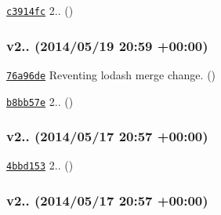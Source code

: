 \begin{DoxyItemize}
\item \href{https://github.com/mikeal/request/commit/c3914fcd4a74faf6dbf0fb6a4a188e871e0c51b8}{\tt c3914fc} 2.. ()
\end{DoxyItemize}

\subsubsection*{v2.. (2014/05/19 20\+:59 +00\+:00)}


\begin{DoxyItemize}
\item \href{https://github.com/mikeal/request/commit/76a96de75580042aa780e9587ff7a22522119c3f}{\tt 76a96de} Reventing lodash merge change. ()
\item \href{https://github.com/mikeal/request/commit/b8bb57efb17e72e2ac6d957c05c3f2570c7ba6a0}{\tt b8bb57e} 2.. ()
\end{DoxyItemize}

\subsubsection*{v2.. (2014/05/17 20\+:57 +00\+:00)}


\begin{DoxyItemize}
\item \href{https://github.com/mikeal/request/commit/4bbd1532a68cadf1a88dd69c277645e9b781f364}{\tt 4bbd153} 2.. ()
\end{DoxyItemize}

\subsubsection*{v2.. (2014/05/17 20\+:57 +00\+:00)}


